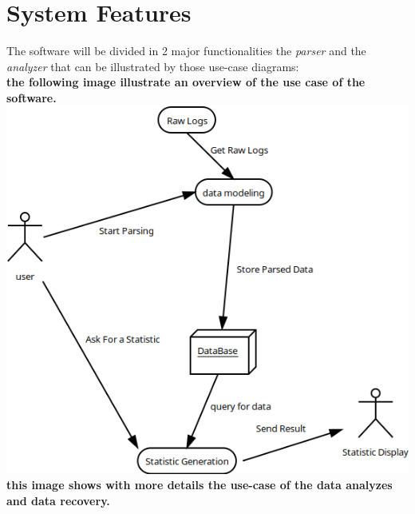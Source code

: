 \documentclass{scrreprt}
\begin{document}
\chapter{System Features}
The software will be divided in 2 major functionalities the \textit{parser}  and
the \textit{analyzer} that can be illustrated by those use-case diagrams:\\

\textbf{the following image illustrate an overview of the use case of the software.}\\
\includegraphics[width=\textwidth,height=\textheight,keepaspectratio]{UseCaseParsing}
\newpage
\textbf{this image shows with more details the use-case of the data analyzes and
data recovery.}\\
\\
\end{document}
